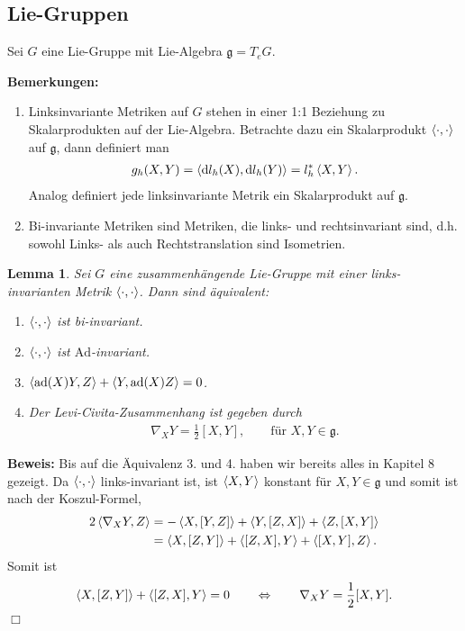 \documentclass[12pt,a4paper]{article}
\def\Ad{\mathrm{Ad}}
\def\ad{\mathrm{ad}}
\def\g{\mathfrak{g}}
\def\ad{\mathrm{ad}}
\newtheorem{Lemma}{Lemma}[section]
\def\proof{\noindent\textbf{Beweis:}\quad}
\def\qed{\quad\hfill\ensuremath{\Box}}
\begin{document}
\subsection{Lie-Gruppen}

Sei $G$ eine Lie-Gruppe mit Lie-Algebra $\g = T_eG$.

\bigskip

{\bf Bemerkungen:}
\begin{enumerate}
  \item 
Linksinvariante Metriken auf $G$ stehen in einer 1:1 Beziehung zu
Skalarprodukten auf der Lie-Algebra. Betrachte dazu  ein
Skalarprodukt $\left\langle\cdot,\cdot\right\rangle$ auf $\g$, dann definiert man
\begin{align*}
g_h(X,Y) = \left\langle\mathrm{d} l_h(X),\mathrm{d} l_h(Y)\right\rangle = 
l_{h}^*\left\langle X,Y\right\rangle.
\end{align*}
Analog definiert jede linksinvariante Metrik ein Skalarprodukt auf $\g$.
\item Bi-invariante Metriken sind Metriken, die links- und rechtsinvariant sind,
d.h. sowohl Links- als auch Rechtstranslation sind Isometrien.
\end{enumerate}

\bigskip

\begin{Lemma}
Sei $G$ eine zusammenh\"angende Lie-Gruppe mit einer links-invarianten Metrik
$\left\langle\cdot,\cdot\right\rangle$. Dann sind \"aquivalent:
\begin{enumerate}
  \item $\left\langle\cdot,\cdot\right\rangle$ ist bi-invariant.
  \item $\left\langle\cdot,\cdot\right\rangle$ ist $\Ad$-invariant.
  \item $\scp{\ad(X)Y,Z} + \scp{Y,\ad(X)Z} = 0$.
  \item Der Levi-Civita-Zusammenhang ist gegeben durch
\begin{align*}
\nabla_X Y = \frac{1}{2}[X,Y],\qquad \text{f\"ur }X,Y\in\g. 
\end{align*}
\end{enumerate}
\end{Lemma}

\proof
Bis auf die \"Aquivalenz 3. und 4. haben wir bereits alles in Kapitel 8 gezeigt.
Da $\left\langle\cdot,\cdot\right\rangle$ links-invariant ist, ist $\left\langle X,Y\right\rangle$ konstant f\"ur
$X,Y\in\g$ und somit ist nach der Koszul-Formel,
\begin{align*}
2\left\langle\nabla_X Y,Z\right\rangle &= -\left\langle X,[Y,Z]\right\rangle + \left\langle Y,[Z,X]\right\rangle + \left\langle Z,[X,Y]\right\rangle\\
&=\left\langle X,[Z,Y]\right\rangle + \left\langle[Z,X],Y\right\rangle + \left\langle[X,Y],Z\right\rangle.
\end{align*}
Somit ist
\begin{align*}
\left\langle X,[Z,Y]\right\rangle + \left\langle[Z,X],Y\right\rangle = 0 \qquad\Leftrightarrow\qquad \nabla_X Y =
\frac{1}{2}[X,Y].
\end{align*}
\qed
\end{document}

